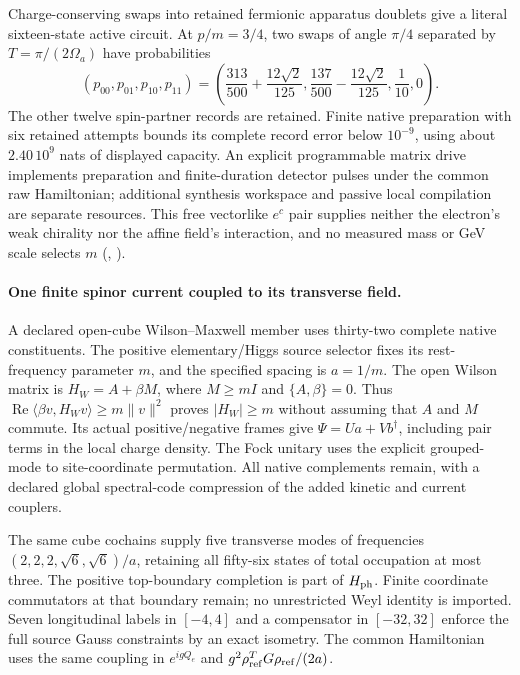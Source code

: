 Charge-conserving swaps into retained fermionic apparatus doublets give
a literal sixteen-state active circuit. At $p/m=3/4$, two swaps of angle
$\pi/4$ separated by $T=\pi/(2\Omega_a)$ have probabilities
\[
 (p_{00},p_{01},p_{10},p_{11})=
 \left(\frac{313}{500}+\frac{12\sqrt2}{125},
 \frac{137}{500}-\frac{12\sqrt2}{125},\frac1{10},0\right).
\]
The other twelve spin-partner records are retained. Finite native
preparation with six retained attempts bounds its complete record error
below $10^{-9}$, using about $2.40\,10^9$ nats of displayed capacity.
An explicit programmable matrix drive implements preparation and
finite-duration detector pulses under the common raw Hamiltonian;
additional synthesis workspace and passive local compilation are separate
resources. This free vectorlike $e^c$ pair supplies neither the electron's
weak chirality nor the affine field's interaction, and no measured mass
or GeV scale selects $m$ (, \cite{ophrepo}).

\paragraph{One finite spinor current coupled to its transverse field.}
A declared open-cube Wilson--Maxwell member uses thirty-two complete
native constituents. The positive elementary/Higgs source selector fixes
its rest-frequency parameter $m$, and the specified spacing is $a=1/m$.
The open Wilson matrix is $H_W=A+\beta M$, where $M\ge mI$ and
$\{A,\beta\}=0$. Thus
$\operatorname{Re}\langle\beta v,H_Wv\rangle\ge m\|v\|^2$ proves
$|H_W|\ge m$ without assuming that $A$ and $M$ commute. Its actual
positive/negative frames give $\Psi=Ua+Vb^\dagger$, including pair terms
in the local charge density. The Fock unitary uses the explicit
grouped-mode to site-coordinate permutation. All native complements
remain, with a declared global spectral-code compression of the added
kinetic and current couplers.

The same cube cochains supply five transverse modes of frequencies
$(2,2,2,\sqrt6,\sqrt6)/a$, retaining all fifty-six states of total
occupation at most three. The positive top-boundary completion is part
of $H_{\rm ph}$. Finite coordinate commutators at that boundary remain;
no unrestricted Weyl identity is imported. Seven longitudinal labels
in $[-4,4]$ and a compensator in $[-32,32]$ enforce the full source Gauss
constraints by an exact isometry. The common Hamiltonian uses the same
coupling in $e^{igQ_e}$ and $g^2\rho_{\rm ref}^{T}G\rho_{\rm ref}/(2a)$.

